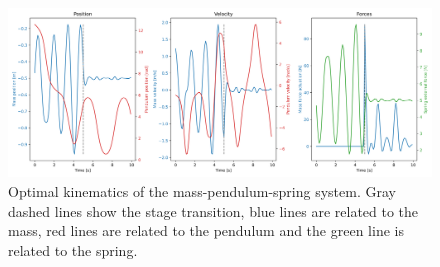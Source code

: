 \begin{figure}[t!]
\centering
\includegraphics[width=\textwidth]{figures/Mass_Pendulum_Fext.png}
\caption{Optimal kinematics of the mass-pendulum-spring system. Gray dashed lines show the stage transition, blue lines are related to the mass, red lines are related to the pendulum and the green line is related to the spring.}
\label{fig:Mass_Pendulum_Fext_graphs}
\end{figure}














